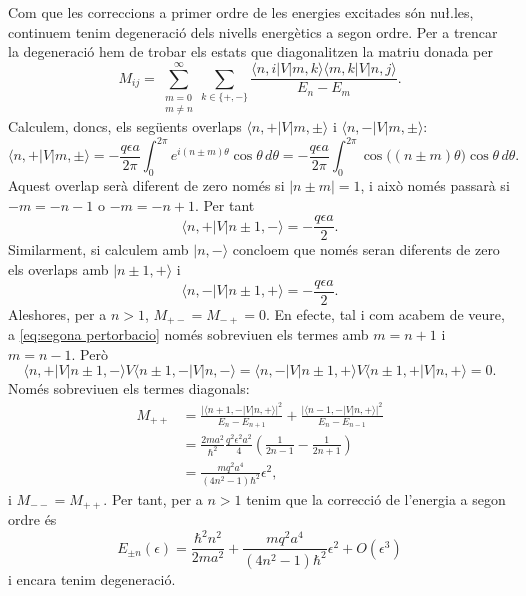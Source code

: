 \documentclass[12pt]{article}
\numberwithin{table}{section}
\numberwithin{figure}{section}
\newcommand{\abs}[1]{\lvert #1 \rvert}
\newcommand{\ket}[1]{\vert {#1} \rangle}
\newcommand{\bra}[1]{\langle #1 \vert}
\begin{document}
Com que les correccions a primer ordre de les energies excitades són nu\l.les, continuem tenim degeneració dels nivells energètics a segon ordre. Per a trencar la degeneració hem de trobar els estats que diagonalitzen la matriu donada per
\begin{equation} \label{eq:segona pertorbacio}
	M_{ij} = \sum_{\substack{m = 0 \\ m \neq n}}^{\infty} \sum_{k \in \{+,-\}} \frac{\bra{n,i}V\ket{m,k} \bra{m,k}V\ket{n,j}}{E_n - E_m}. 
\end{equation}
Calculem, doncs, els següents overlaps \( \bra{n,+}V\ket{m,\pm} \) i \( \bra{n,-}V\ket{m,\pm} \):
\begin{equation*}
	\bra{n,+} V \ket{m,\pm} = -\frac{q\epsilon a}{2\pi} \int_0^{2\pi} e^{i(n \pm m)\theta} \cos{\theta} \,d\theta = -\frac{q\epsilon a}{2\pi} \int_0^{2\pi} \cos{\big((n\pm m)\theta\big)} \cos{\theta} \,d\theta.
\end{equation*}
Aquest overlap serà diferent de zero només si \( \abs{n \pm m} = 1 \), i això només passarà si \( -m = -n -1 \) o \( -m  = -n+1 \). Per tant
\begin{equation*}
	\bra{n,+} V \ket{n \pm	1,-} = -\frac{q\epsilon a}{2}.
\end{equation*}
Similarment, si calculem amb \( \ket{n,-} \) concloem que només seran diferents de zero els overlaps amb \( \ket{n \pm 1, +} \) i
\begin{equation*}
	\bra{n,-} V \ket{n \pm	1,+} = -\frac{q\epsilon a}{2}.
\end{equation*}
Aleshores, per a \( n > 1 \), \( M_{+-} = M_{-+} = 0 \). En efecte, tal i com acabem de veure, a \cref{eq:segona pertorbacio} només sobreviuen els termes amb \( m = n+1 \) i \( m = n-1 \). Però
\begin{equation*}
	\bra{n,+}V\ket{n\pm1,-}V\bra{n\pm1,-}V\ket{n,-} = \bra{n,-}V\ket{n\pm1,+}V\bra{n\pm1,+}V\ket{n,+} = 0.
\end{equation*}
Només sobreviuen els termes diagonals:
\begin{align*}
	M_{++} &= \frac{\abs{\bra{n+1,-}V\ket{n,+}}^2}{E_n - E_{n+1}} + \frac{\abs{\bra{n-1,-}V\ket{n,+}}^2}{E_n - E_{n-1}} \\
				 &= \frac{2ma^2}{\hbar^2}\frac{q^2\epsilon^2a^2}{4}\left(\frac{1}{2n - 1} - \frac{1}{2n + 1}\right) \\
				 &= \frac{mq^2a^4}{(4n^2 - 1)\hbar^2}\epsilon^2,
\end{align*}
i \( M_{--} = M_{++} \). Per tant, per a \( n > 1 \) tenim que la correcció de l'energia a segon ordre és
\begin{equation*}
	E_{\pm n}(\epsilon) = \frac{\hbar^2n^2}{2ma^2} + \frac{mq^2a^4}{(4n^2 - 1)\hbar^2}\epsilon^2 + O(\epsilon^3) 
\end{equation*}
i encara tenim degeneració.
\end{document}
